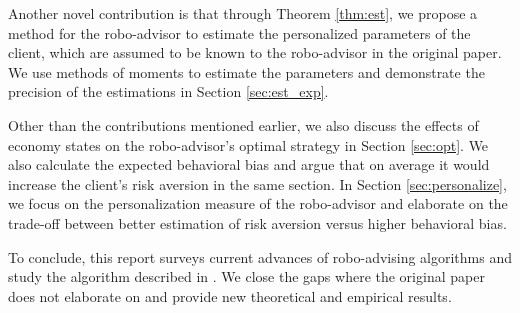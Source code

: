 Another novel contribution is that through Theorem \ref{thm:est}, we propose a method for the robo-advisor to estimate the personalized parameters of the client, which are assumed to be known to the robo-advisor in the original paper. We use methods of moments to estimate the parameters and demonstrate the precision of the estimations in Section \ref{sec:est_exp}.

Other than the contributions mentioned earlier, we also discuss the effects of economy states on the robo-advisor's optimal strategy in Section \ref{sec:opt}. We also calculate the expected behavioral bias and argue that on average it would increase the client's risk aversion in the same section. In Section \ref{sec:personalize}, we focus on the personalization measure of the robo-advisor and elaborate on the trade-off between better estimation of risk aversion versus higher behavioral bias. 

To conclude, this report surveys current advances of robo-advising algorithms and study the algorithm described in . We close the gaps where the original paper does not elaborate on and provide new theoretical and empirical results.